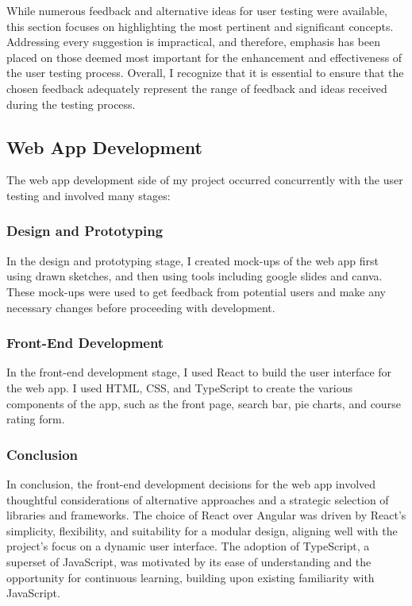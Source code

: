 \documentclass[10pt,twocolumn]{article}
\begin{document}
While numerous feedback and alternative ideas for user testing were available, this section focuses on highlighting the most pertinent and significant concepts. Addressing every suggestion is impractical, and therefore, emphasis has been placed on those deemed most important for the enhancement and effectiveness of the user testing process. Overall, I recognize that it is essential to ensure that the chosen feedback adequately represent the range of feedback and ideas received during the testing process.

\subsection{Web App Development}
The web app development side of my project occurred concurrently with the user testing and involved many stages: 

\subsubsection{Design and Prototyping}
In the design and prototyping stage, I created mock-ups of the web app first using drawn sketches, and then using tools including google slides and canva. These mock-ups were used to get feedback from potential users and make any necessary changes before proceeding with development.

\subsubsection{Front-End Development}
In the front-end development stage, I used React to build the user interface for the web app. I used HTML, CSS, and TypeScript to create the various components of the app, such as the front page, search bar, pie charts, and course rating form.

\subsubsection{Conclusion}
In conclusion, the front-end development decisions for the web app involved thoughtful considerations of alternative approaches and a strategic selection of libraries and frameworks. The choice of React over Angular was driven by React's simplicity, flexibility, and suitability for a modular design, aligning well with the project's focus on a dynamic user interface. The adoption of TypeScript, a superset of JavaScript, was motivated by its ease of understanding and the opportunity for continuous learning, building upon existing familiarity with JavaScript.
\end{document}
